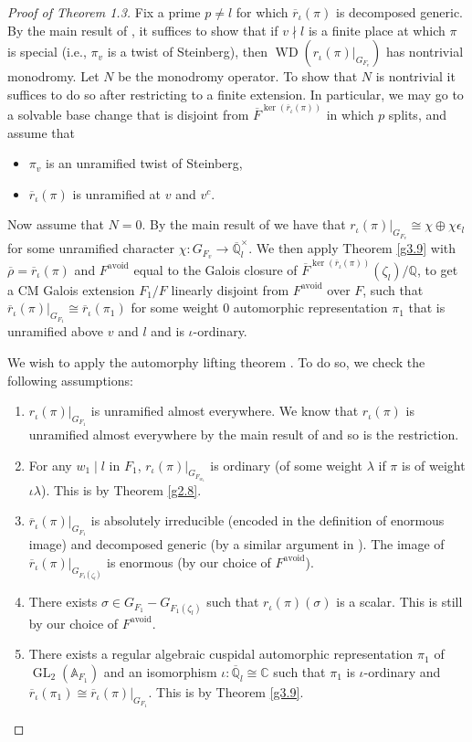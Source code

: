 \documentclass[10pt]{article}
\theoremstyle{definition}
\numberwithin{equation}{theorem}
\newcommand{\AAA}{\mathbb{A}}
\newcommand{\CC}{\mathbb{C}}
\newcommand{\QQ}{\mathbb{Q}}
\DeclareMathOperator{\GL}{GL}
\DeclareMathOperator{\WD}{WD}
\begin{document}
\begin{proof}[Proof of Theorem 1.3]
Fix a prime $p\ne l$ for which $\overline{r}_{\iota}(\pi)$ is decomposed generic. By the main result of \cite{Var14}, it suffices to show that if $v\nmid l$ is a finite place at which $\pi$ is special (i.e., $\pi_v$ is a twist of Steinberg), then $\WD(r_{\iota}(\pi)|_{G_{F_v}})$ has nontrivial monodromy. Let $N$ be the monodromy operator. To show that $N$ is nontrivial it suffices to do so after restricting to a finite extension. In particular, we may go to a solvable base change that is disjoint from $\overline{F}^{\ker(\overline{r}_{\iota}(\pi))}$ in which $p$ splits, and assume that 
\begin{itemize}
    \item $\pi_v$ is an unramified twist of Steinberg,
    \item $\overline{r}_{\iota}(\pi)$ is unramified at $v$ and $v^c$.
\end{itemize}

Now assume that $N=0$. By the main result of \cite{Var14} we have that $r_{\iota}(\pi)|_{G_{F_v}}\cong\chi\oplus\chi\epsilon_l$ for some unramified character $\chi:G_{F_v}\to\overline{\QQ}_l^\times$. We then apply Theorem \ref{g3.9} with $\overline{\rho}=\overline{r}_{\iota}(\pi)$ and $F^\text{avoid}$ equal to the Galois closure of $\overline{F}^{\ker(\overline{r}_{\iota}(\pi))}(\zeta_l)/\QQ$, to get a CM Galois extension $F_1/F$ linearly disjoint from $F^\text{avoid}$ over $F$, such that $\overline{r}_{\iota}(\pi)|_{G_{F_1}}\cong\overline{r}_{\iota}(\pi_1)$ for some weight 0 automorphic representation $\pi_1$ that is unramified above $v$ and $l$ and is $\iota$-ordinary. 

We wish to apply the automorphy lifting theorem \cite[Theorem~6.1.2]{ACC+18}. To do so, we check the following assumptions:
\begin{enumerate}
    \item $r_{\iota}(\pi)|_{G_{F_1}}$ is unramified almost everywhere. We know that $r_{\iota}(\pi)$ is unramified almost everywhere by the main result of \cite{HLTT16} and so is the restriction.
    \item For any $w_1\mid l$ in $F_1$, $r_{\iota}(\pi)|_{G_{F_{w_1}}}$ is ordinary (of some weight $\lambda$ if $\pi$ is of weight $\iota\lambda$). This is by Theorem \ref{g2.8}.
    \item $\overline{r}_{\iota}(\pi)|_{G_{F_1}}$ is absolutely irreducible (encoded in the definition of enormous image) and decomposed generic (by a similar argument in \cite[Theorem~4.1]{AN19}). The image of $\overline{r}_{\iota}(\pi)|_{G_{F_1(\zeta_l)}}$ is enormous (by our choice of $F^\text{avoid}$).
    \item There exists $\sigma\in G_{F_1}-G_{F_1(\zeta_l)}$ such that $r_{\iota}(\pi)(\sigma)$ is a scalar. This is still by our choice of $F^\text{avoid}$.
    \item There exists a regular algebraic cuspidal automorphic representation $\pi_1$ of $\GL_2(\AAA_{F_1})$ and an isomorphism $\iota:\overline{\QQ}_l\cong\CC$ such that $\pi_1$ is $\iota$-ordinary and $\overline{r}_{\iota}(\pi_1)\cong \overline{r}_{\iota}(\pi)|_{G_{F_1}}$. This is by Theorem \ref{g3.9}.
\end{enumerate}


\end{proof}
\end{document}
